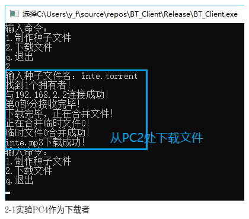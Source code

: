 \documentclass[thesis]{thesis}
\begin{document}
	\begin{minipage}{0.5\linewidth}
	\begin{figure}[H]
		\centering
		\includegraphics[width=\linewidth]{fig/PC4_12.png}
		\caption{2-1实验\quad PC4作为下载者}
		\label{res:PC4_12}
	\end{figure}
	\end{minipage}
	
\end{document}
